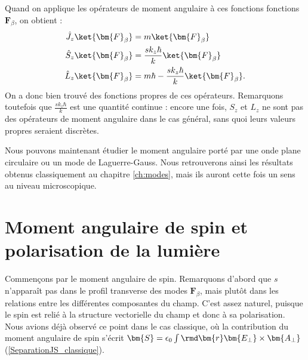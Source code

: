 Quand on applique les opérateurs de moment angulaire à ces fonctions fonctions $\bm{F}_{\beta}$, on obtient :
\begin{equation}
\begin{alignedat}{1}
\hat{J}_z\ket{\bm{F}_{\beta}} &= m\ket{\bm{F}_{\beta}}\\
\hat{S}_z\ket{\bm{F}_{\beta}} &= \frac{sk_z\hbar}{k}\ket{\bm{F}_{\beta}}\\
\hat{L}_z\ket{\bm{F}_{\beta}} &= m\hbar-\frac{sk_z\hbar}{k}\ket{\bm{F}_{\beta}}.
\end{alignedat}
\label{eq.VP_AM}
\end{equation}
On a donc bien trouvé des fonctions propres de ces opérateurs. Remarquons toutefois que $\frac{sk_z\hbar}{k}$ est une quantité continue : encore une fois, $S_z$ et $L_z$ ne sont pas des opérateurs de moment angulaire dans le cas général, sans quoi leurs valeurs propres seraient discrètes. \par
Nous pouvons maintenant étudier le moment angulaire porté par une onde plane circulaire ou un mode de Laguerre-Gauss. Nous retrouverons ainsi les résultats obtenus classiquement au chapitre \ref{ch:modes}, mais ils auront cette fois un sens au niveau microscopique.

\section{Moment angulaire de spin et polarisation de la lumière}
Commençons par le moment angulaire de spin. Remarquons d'abord que $s$ n'apparaît pas dans le profil transverse des modes $\bm{F}_{\beta}$, mais plutôt dans les relations entre les différentes composantes du champ. C'est assez naturel, puisque le spin est relié à la structure vectorielle du champ et donc à sa polarisation. Nous avions déjà observé ce point dans le cas classique, où la contribution du moment angulaire de spin s'écrit $\bm{S}=\epsilon_0\int{\rmd\bm{r}\bm{E_{\bot}}\times\bm{A_{\bot}}}$ (\ref{SeparationJS_classique}).

